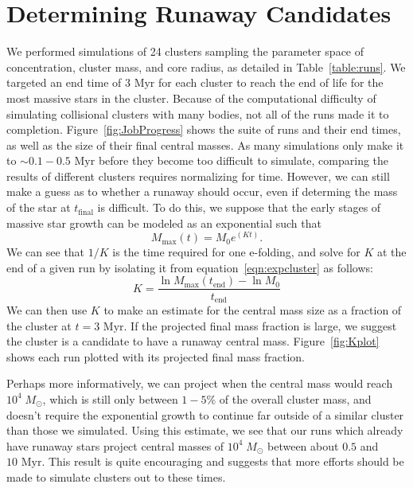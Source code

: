 \documentclass{princeton_astro_thesis}
\newcommand\Msun{\; M_\odot}
\newcommand\Myr{\mbox{ Myr}}
\numberwithin{equation}{section}
\begin{document}
\section{Determining Runaway Candidates}
We performed simulations of 24 clusters sampling the parameter space of concentration, cluster mass, and core radius, as detailed in Table~\ref{table:runs}. We targeted an end time of $3 \Myr$ for each cluster to reach the end of life for the most massive stars in the cluster. Because of the computational difficulty of simulating collisional clusters with many bodies, not all of the runs made it to completion. Figure~\ref{fig:JobProgress} shows the suite of runs and their end times, as well as the size of their final central masses. As many simulations only make it to $\sim 0.1 - 0.5 \Myr$ before they become too difficult to simulate, comparing the results of different clusters requires normalizing for time. However, we can still make a guess as to whether a runaway should occur, even if determing the mass of the star at $t_{\mathrm{final}}$ is difficult. To do this, we suppose that the early stages of massive star growth can be modeled as an exponential such that
\begin{equation}
    M_{\mathrm{max}}(t) = M_{0} e^{(Kt)}.
    \label{eqn:expcluster}
\end{equation}
We can see that $1/K$ is the time required for one e-folding, and solve for $K$ at the end of a given run by isolating it from equation~\ref{eqn:expcluster} as follows:
\begin{equation}
K = \frac{\ln M_{\mathrm{max}}(t_{\mathrm{end}}) - \ln M_{0}}{t_{\mathrm{end}}}
\end{equation}
We can then use $K$ to make an estimate for the central mass size as a fraction of the cluster at $t = 3 \Myr$.  If the projected final mass fraction is large, we suggest the cluster is a candidate to have a runaway central mass. Figure~\ref{fig:Kplot} shows each run plotted with its projected final mass fraction.

Perhaps more informatively, we can project when the central mass would reach $10^4 \Msun$, which is still only between $1-5\%$ of the overall cluster mass, and doesn't require the exponential growth to continue far outside of a similar cluster than those we simulated.  Using this estimate, we see that our runs which already have runaway stars project central masses of $10^4 \Msun$ between about $0.5$ and $10 \Myr$. This result is quite encouraging and suggests that more efforts should be made to simulate clusters out to these times.
\end{document}
